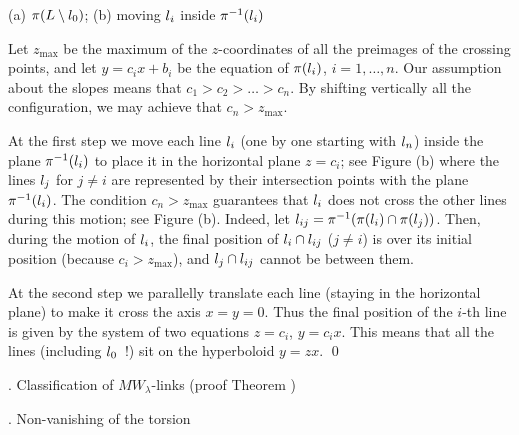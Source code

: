\midinsert
\centerline{\epsfxsize=90mm}
 (a) $\pi(L\setminus l_0)$; (b) moving $l_i$ inside $\pi^{-1}(l_i)$
\endcaption
\endinsert

Let $z_{\max}$ be the maximum of the $z$-coordinates of all the preimages of the crossing points,
and let $y=c_i x+ b_i$ be the equation of $\pi(l_i)$,
$i=1,\dots,n$. Our assumption about the slopes means that $c_1>c_2>\dots>c_n$.
By shifting vertically all the configuration, we may achieve that $c_n>z_{\max}$.
 
At the first step we move each line $l_i$ (one by one starting with $l_n$)
inside the plane $\pi^{-1}(l_i)$ to place it in the horizontal plane $z=c_i$; see
Figure \figHopf(b) where the lines $l_j$ for $j\ne i$ are represented by their
intersection points with the plane $\pi^{-1}(l_i)$.
The condition $c_n>z_{\max}$ guarantees that $l_i$ does not cross the other lines
during this motion; see Figure \figHopf(b).
Indeed, let $l_{ij}=\pi^{-1}(\pi(l_i)\cap\pi(l_j))$.
Then, during the motion of $l_i$, the final 
position of $l_i\cap l_{ij}$ ($j\ne i$) is over its initial position (because $c_i>z_{\max}$),
and $l_j\cap l_{ij}$ cannot be between them.

At the second step we parallelly translate each line (staying in the horizontal plane) to make it
cross the axis $x=y=0$. Thus the final position of the $i$-th line is given by the system of two equations
$z=c_i$, $y=c_i x$. This means that all the lines (including $l_0$~!) sit on the hyperboloid
$y = zx$.
\qed\enddemo




\head\sectProofMainTh. Classification of $MW_\lambda$-links (proof Theorem \thAnyGenus)
\endhead

\subhead   \sectTors. Non-vanishing of the torsion
\endsubhead

